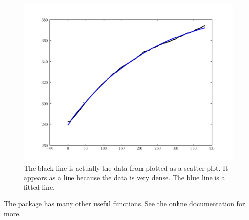 \begin{figure}
\includegraphics[width=\textwidth]{HeatingFit.pdf}
\caption{The black line is actually the data from  plotted as a scatter plot. It appears as a line because the data is very dense. The blue line is a fitted line. }
\label{opt:HeatingFit}
\end{figure}

The  package has many other useful functions. See the online documentation for more.


